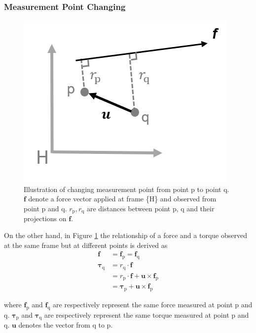\subsubsection{Measurement Point Changing}
\begin{figure}[htbp]
\label{fig:sensor_comp2}
\begin{center}
\includegraphics[width=0.65	\linewidth]{Images/sensor_comp 2.png}
\caption{
Illustration of changing measurement point from point p to point q. $\boldsymbol{f}$ denote a force vector applied at frame \{H\} and observed from point p and q. $r_{\mathrm{p}},r_{\mathrm{q}}$ are distances between point p, q and their projections on $\boldsymbol{f}$.
}
\end{center}
\end{figure}
\par\noindent
\hspace{6mm}On the other hand, in Figure \ref{fig:sensor_comp2} the relationship of a force and a torque observed at the same frame but at different points is derived as
\begin{equation}
\begin{split}
\boldsymbol{f}				&= \boldsymbol{f}_\mathrm{p} = \boldsymbol{f}_\mathrm{q}\\
\boldsymbol{\tau}_\mathrm{q} 	&= r_\mathrm{q} \cdot \boldsymbol{f}\\
			 				&= r_\mathrm{p} \cdot \boldsymbol{f}+\boldsymbol{u} \times \boldsymbol{f}_\mathrm{p}\\
			 				&= \boldsymbol{\tau}_\mathrm{p} + \boldsymbol{u}\times \boldsymbol{f}_\mathrm{p}
\end{split}
\end{equation}
\par\noindent
where $\boldsymbol{f}_\mathrm{p}$ and $\boldsymbol{f}_\mathrm{q}$ are respectively represent the same force measured at point p and q. $\boldsymbol{\tau}_\mathrm{p}$ and $\boldsymbol{\tau}_\mathrm{q}$ are respectively represent the same torque measured at point p and q. $\boldsymbol{u}$ denotes the vector from q to p.
